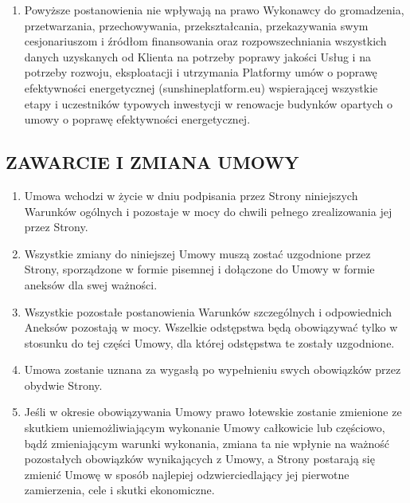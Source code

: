 \begin{multicols}{2}
\begin{enumerate}
	\item Powyższe postanowienia nie wpływają na prawo Wykonawcy do gromadzenia, przetwarzania, przechowywania, przekształcania, przekazywania swym cesjonariuszom i źródłom finansowania oraz rozpowszechniania wszystkich danych uzyskanych od Klienta na potrzeby poprawy jakości Usług i na potrzeby rozwoju, eksploatacji i utrzymania Platformy umów o poprawę efektywności energetycznej (sunshineplatform.eu) wspierającej wszystkie etapy i uczestników typowych inwestycji w renowacje budynków opartych o umowy o poprawę efektywności energetycznej.
\end{enumerate}

\subsection{ZAWARCIE I ZMIANA UMOWY}
\begin{enumerate}
	\item Umowa wchodzi w życie w dniu podpisania przez Strony niniejszych Warunków ogólnych i pozostaje w mocy do chwili pełnego zrealizowania jej przez Strony.
	\item Wszystkie zmiany do niniejszej Umowy muszą zostać uzgodnione przez Strony, sporządzone w formie pisemnej i dołączone do Umowy w formie aneksów dla swej ważności.
	\item Wszystkie pozostałe postanowienia Warunków szczególnych i odpowiednich Aneksów pozostają w mocy. Wszelkie odstępstwa będą obowiązywać tylko  w stosunku do tej części Umowy, dla której odstępstwa te zostały uzgodnione.
	\item Umowa zostanie uznana za wygasłą po wypełnieniu swych obowiązków przez obydwie Strony.
	\item Jeśli w okresie obowiązywania Umowy prawo łotewskie zostanie zmienione ze skutkiem uniemożliwiającym wykonanie Umowy całkowicie lub częściowo, bądź zmieniającym warunki wykonania, zmiana ta nie wpłynie na ważność pozostałych obowiązków wynikających z Umowy, a Strony postarają się zmienić Umowę w sposób najlepiej odzwierciedlający jej pierwotne zamierzenia, cele i skutki ekonomiczne.
\end{enumerate}


\end{multicols}
